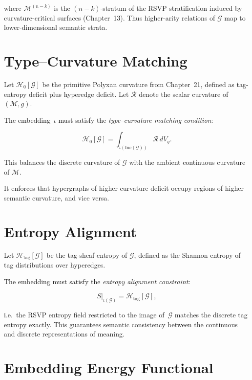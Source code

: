 where $\mathcal{M}^{(n-k)}$ is the $(n-k)$-stratum of the RSVP
stratification induced by curvature-critical surfaces (Chapter~13).
Thus higher-arity relations of $\mathcal{G}$ map to lower-dimensional
semantic strata.

\section{Type--Curvature Matching}

Let $\mathcal{H}_0[\mathcal{G}]$ be the primitive Polyxan curvature from
Chapter~21, defined as tag-entropy deficit plus hyperedge deficit.
Let $\mathcal{R}$ denote the scalar curvature of $(\mathcal{M},g)$.

The embedding~$\iota$ must satisfy the \emph{type--curvature matching
condition}:

\begin{equation}
\label{eq:type-curvature-matching}
\mathcal{H}_0[\mathcal{G}]
  = \int_{\iota(\mathrm{Inc}(\mathcal{G}))} \mathcal{R}\, dV_g.
\end{equation}

This balances the discrete curvature of $\mathcal{G}$ with the ambient
continuous curvature of $\mathcal{M}$.

It enforces that hypergraphs of higher curvature deficit occupy regions
of higher semantic curvature, and vice versa.

\section{Entropy Alignment}

Let $\mathcal{H}_{\mathrm{tag}}[\mathcal{G}]$ be the tag-sheaf entropy of
$\mathcal{G}$, defined as the Shannon entropy of tag distributions over
hyperedges.

The embedding must satisfy the \emph{entropy alignment constraint}:

\begin{equation}
\label{eq:entropy-alignment}
S\big\rvert_{\iota(\mathcal{G})}
  = \mathcal{H}_{\mathrm{tag}}[\mathcal{G}],
\end{equation}

i.e.\ the RSVP entropy field restricted to the image of~$\mathcal{G}$
matches the discrete tag entropy exactly.  
This guarantees semantic consistency between the continuous and discrete
representations of meaning.

\section{Embedding Energy Functional}

